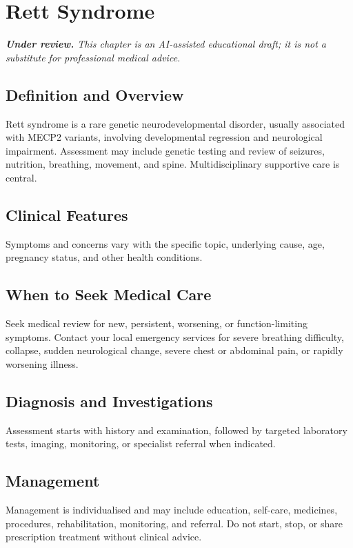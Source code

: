 \chapter{Rett Syndrome}

\medskip
\noindent\textit{\textbf{Under review.} This chapter is an AI-assisted educational draft; it is not a substitute for professional medical advice.}

\section*{Definition and Overview}
Rett syndrome is a rare genetic neurodevelopmental disorder, usually associated with MECP2 variants, involving developmental regression and neurological impairment. Assessment may include genetic testing and review of seizures, nutrition, breathing, movement, and spine. Multidisciplinary supportive care is central.

\section*{Clinical Features}
Symptoms and concerns vary with the specific topic, underlying cause, age, pregnancy status, and other health conditions.

\section*{When to Seek Medical Care}
Seek medical review for new, persistent, worsening, or function-limiting symptoms. Contact your local emergency services for severe breathing difficulty, collapse, sudden neurological change, severe chest or abdominal pain, or rapidly worsening illness.

\section*{Diagnosis and Investigations}
Assessment starts with history and examination, followed by targeted laboratory tests, imaging, monitoring, or specialist referral when indicated.

\section*{Management}
Management is individualised and may include education, self-care, medicines, procedures, rehabilitation, monitoring, and referral. Do not start, stop, or share prescription treatment without clinical advice.

